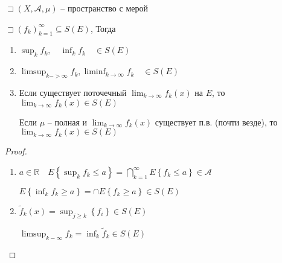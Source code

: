 \documentclass{book}
\newcommand\R{\ensuremath{\mathbb{R}}}
\newcommand{\tl}[1]{\widetilde{#1}}
\theoremstyle{definition}
\begin{document}
\begin{theorem}
    $\sqsupset \left( X, \mathcal A, \mu \right) $ -- пространство с мерой

    $\sqsupset \left( f_k \right) _{k=1}^{\infty }\subseteq S(E)$, Тогда
    \begin{enumerate}
        \item $\sup_k f_k,\quad \inf_k f_k\quad \in S(E)$
        \item  $\limsup_{k->\infty } f_k, \liminf_{k\to \infty}f_k\quad \in S(E)$ 
        \item Если существует поточечный $\lim_{k \to \infty} f_k(x)$ на $E$, то $\lim_{k \to \infty} f_k(x)\in S(E)$ 

            Если $\mu$ -- полная и  $\lim_{k \to \infty} f_k(x)  $ существует п.в. (почти везде), то $\lim_{k \to \infty} f_k(x)\in S(E)$ 
    \end{enumerate}
\end{theorem}
\begin{proof}
    \begin{enumerate}
        \item $a\in \R\quad E\left\{ \sup_k f_k\leqslant a \right\} = \bigcap\limits_{k=1}^{\infty }E\left\{ f_k\leqslant a \right\} \in \mathcal A  $ 

            $E\left\{ \inf_k f_k \geqslant a \right\}  = \cap E\left\{ f_k\geqslant a \right\} \in S(E)$
        \item $\tl f_k(x) = \sup_{j\geqslant k}\left\{ f_i \right\} \in S(E)$

            $\limsup_{k-\infty }f_k = \inf _k \tl f_k \in S(E)$
    \end{enumerate}
\end{proof}
\end{document}
